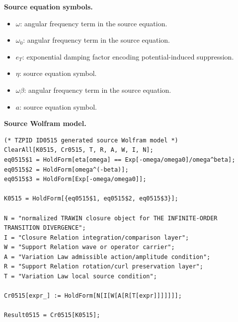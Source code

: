 \begin{minipage}[t]{0.49\linewidth}
\begingroup
\small
\raggedright
\textbf{Source equation symbols.}\par
\begin{itemize}[leftmargin=1.35em,itemsep=1pt,topsep=1pt,parsep=0pt]
    \item $\omega$: angular frequency term in the source equation.
    \item $\omega_0$: angular frequency term in the source equation.
    \item $e_T$: exponential damping factor encoding potential-induced suppression.
    \item $\eta$: source equation symbol.
    \item $\omega\beta$: angular frequency term in the source equation.
    \item $a$: source equation symbol.
\end{itemize}
\endgroup
\end{minipage}\hfill
\begin{minipage}[t]{0.47\linewidth}
\begingroup
\scriptsize
\raggedright
\textbf{Source Wolfram model.}\par
\begin{Verbatim}[fontsize=\tiny,breaklines=true,breakanywhere=true]
(* TZPID ID0515 generated source Wolfram model *)
ClearAll[K0515, Cr0515, T, R, A, W, I, N];
eq0515$1 = HoldForm[eta[omega] == Exp[-omega/omega0]/omega^beta];
eq0515$2 = HoldForm[omega^(-beta)];
eq0515$3 = HoldForm[Exp[-omega/omega0]];

K0515 = HoldForm[{eq0515$1, eq0515$2, eq0515$3}];

N = "normalized TRAWIN closure object for THE INFINITE-ORDER TRANSITION DIVERGENCE";
I = "Closure Relation integration/comparison layer";
W = "Support Relation wave or operator carrier";
A = "Variation Law admissible action/amplitude condition";
R = "Support Relation rotation/curl preservation layer";
T = "Variation Law local source condition";

Cr0515[expr_] := HoldForm[N[I[W[A[R[T[expr]]]]]]];

Result0515 = Cr0515[K0515];
\end{Verbatim}
\endgroup
\end{minipage}

